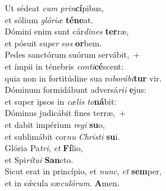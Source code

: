 \evenverse Ut sédeat \textit{cum} \textit{prin}\textbf{cí}pibus,~\*\\
\evenverse et sólium \textit{gló}\textit{ri}\textit{æ} \textbf{té}\textbf{ne}at.\\
\oddverse Dómini enim sunt cár\textit{di}\textit{nes} \textbf{ter}ræ,~\*\\
\oddverse et pósuit su\textit{per} \textit{e}\textit{os} \textbf{or}bem.\\
\evenverse Pedes sanctórum suórum servábit,~+\\
\evenverse  et ímpii in ténebris \textit{con}\textit{ti}\textbf{cé}scent:~\*\\
\evenverse quia non in fortitúdine sua ro\textit{bo}\textit{rá}\textit{bi}\textbf{tur} vir.\\
\oddverse Dóminum formidábunt adversá\textit{ri}\textit{i} \textbf{e}jus:~\*\\
\oddverse et super ipsos in \textit{cæ}\textit{lis} \textit{to}\textbf{ná}bit:\\
\evenverse Dóminus judicábit fines terræ,~+\\
\evenverse  et dabit impérium \textit{re}\textit{gi} \textbf{su}o,~\*\\
\evenverse et sublimábit cor\textit{nu} \textit{Chri}\textit{sti} \textbf{su}i.\\
\oddverse Glória Pa\textit{tri}, \textit{et} \textbf{Fí}lio,~\*\\
\oddverse et Spi\textit{rí}\textit{tu}\textit{i} \textbf{San}cto.\\
\evenverse Sicut erat in princípio, et \textit{nunc}, \textit{et} \textbf{sem}per,~\*\\
\evenverse et in sǽcula sæ\textit{cu}\textit{ló}\textit{rum}. \textbf{A}men.\\
